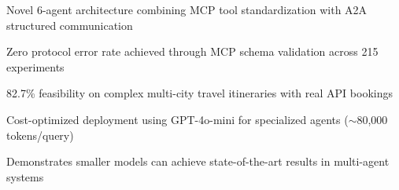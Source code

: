 
\begin{highlights}
\item Novel 6-agent architecture combining MCP tool standardization with A2A structured communication
\item Zero protocol error rate achieved through MCP schema validation across 215 experiments
\item 82.7\% feasibility on complex multi-city travel itineraries with real API bookings
\item Cost-optimized deployment using GPT-4o-mini for specialized agents ($\sim$80,000 tokens/query)
\item Demonstrates smaller models can achieve state-of-the-art results in multi-agent systems
\end{highlights}
